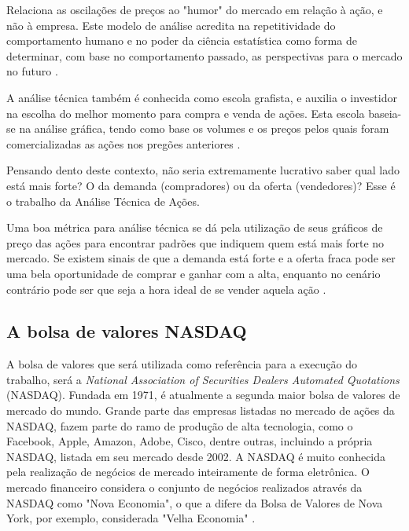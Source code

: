Relaciona as oscilações de preços ao "humor" do mercado em relação à ação, e não à empresa. Este modelo de análise acredita na repetitividade do comportamento humano e no poder da ciência estatística como forma de determinar, com base no comportamento passado, as perspectivas para o mercado no futuro \cite{pereira}.

A análise técnica também é conhecida como escola grafista, e auxilia o investidor na escolha do melhor momento para compra e venda de ações. Esta escola baseia-se na análise gráfica, tendo como base os volumes e os preços pelos quais foram comercializadas as ações nos pregões anteriores \cite{fortuna}.

Pensando dento deste contexto, não seria extremamente lucrativo saber qual lado está mais forte? O da demanda (compradores) ou da oferta (vendedores)? Esse é o trabalho da Análise Técnica de Ações.

Uma boa métrica para análise técnica se dá pela utilização de seus gráficos de preço das ações para encontrar padrões que indiquem quem está mais forte no mercado. Se existem sinais de que a demanda está forte e a oferta fraca pode ser uma bela oportunidade de comprar e ganhar com a alta, enquanto no cenário contrário pode ser que seja a hora ideal de se vender aquela ação \cite{tororadar}.

\subsection{A bolsa de valores NASDAQ}
A bolsa de valores que será utilizada como referência para a execução do trabalho, será a  \textit{National Association of Securities Dealers Automated Quotations} (NASDAQ). Fundada em 1971, é atualmente a segunda maior bolsa de valores de mercado do mundo. Grande parte das empresas listadas no mercado de ações da NASDAQ, fazem parte do ramo de produção de alta tecnologia, como o Facebook, Apple, Amazon, Adobe, Cisco, dentre outras, incluindo a própria NASDAQ, listada em seu mercado desde 2002. 
A NASDAQ é muito conhecida pela realização de negócios de mercado inteiramente de forma eletrônica. O mercado financeiro considera o conjunto de negócios realizados através da NASDAQ como "Nova Economia", o que a difere da Bolsa de Valores de Nova York, por exemplo,  considerada "Velha Economia" \cite{christie}.
